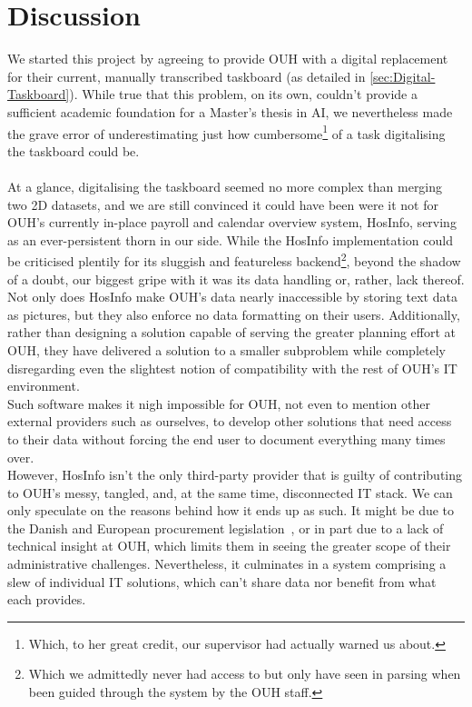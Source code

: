 \section{Discussion}
We started this project by agreeing to provide OUH with a digital replacement for their current, manually transcribed taskboard (as detailed in \autoref{sec:Digital-Taskboard}). While true that this problem, on its own, couldn't provide a sufficient academic foundation for a Master's thesis in AI, we nevertheless made the grave error of underestimating just how cumbersome\footnote{Which, to her great credit, our supervisor had actually warned us about.} of a task digitalising the taskboard could be.
\\
\\
At a glance, digitalising the taskboard seemed no more complex than merging two 2D datasets, and we are still convinced it could have been were it not for OUH's currently in-place payroll and calendar overview system, HosInfo, serving as an ever-persistent thorn in our side. While the HosInfo implementation could be criticised plentily for its sluggish and featureless backend\footnote{Which we admittedly never had access to but only have seen in parsing when been guided through the system by the OUH staff.}, beyond the shadow of a doubt, our biggest gripe with it was its data handling or, rather, lack thereof. Not only does HosInfo make OUH's data nearly inaccessible by storing text data as pictures, but they also enforce no data formatting on their users. Additionally, rather than designing a solution capable of serving the greater planning effort at OUH, they have delivered a solution to a smaller subproblem while completely disregarding even the slightest notion of compatibility with the rest of OUH's IT environment.
\\
Such software makes it nigh impossible for OUH, not even to mention other external providers such as ourselves, to develop other solutions that need access to their data without forcing the end user to document everything many times over.
\\ 
However, HosInfo isn't the only third-party provider that is guilty of contributing to OUH's messy, tangled, and, at the same time, disconnected IT stack. We can only speculate on the reasons behind how it ends up as such. It might be due to the Danish and European procurement legislation~\cite{Udbudsloven, EU-Procurement-Legislation}, or in part due to a lack of technical insight at OUH, which limits them in seeing the greater scope of their administrative challenges. Nevertheless, it culminates in a system comprising a slew of individual IT solutions, which can't share data nor benefit from what each provides.
